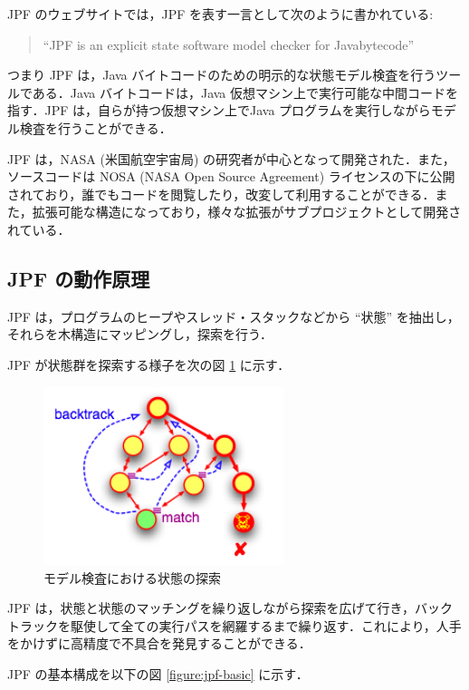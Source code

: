 \documentclass[a4j,12pt]{jarticle}
\begin{document}
JPF のウェブサイトでは，JPF を表す一言として次のように書かれている: \cite{JPF}

\begin{quotation}
``JPF is an explicit state software model checker for Java\texttrademark  bytecode''
\end{quotation}

つまり JPF は，Java バイトコードのための明示的な状態モデル検査を行うツールである．Java バイトコードは，Java 仮想マシン上で実行可能な中間コードを指す．JPF は，自らが持つ仮想マシン上でJava プログラムを実行しながらモデル検査を行うことができる．

JPF は，NASA (米国航空宇宙局) の研究者が中心となって開発された．また，ソースコードは NOSA (NASA Open Source Agreement) ライセンスの下に公開されており，誰でもコードを閲覧したり，改変して利用することができる．また，拡張可能な構造になっており，様々な拡張がサブプロジェクトとして開発されている．

\subsection{JPF の動作原理}

JPF は，プログラムのヒープやスレッド・スタックなどから ``状態'' を抽出し，それらを木構造にマッピングし，探索を行う．

JPF が状態群を探索する様子を次の図 \ref{figure:states-mc} に示す．

\begin{figure}[here]
\centering
\includegraphics[width=7cm]{images/states-mc.png}
\caption{モデル検査における状態の探索 \cite{JPF}}
\label{figure:states-mc}
\end{figure}

JPF は，状態と状態のマッチングを繰り返しながら探索を広げて行き，バックトラックを駆使して全ての実行パスを網羅するまで繰り返す．これにより，人手をかけずに高精度で不具合を発見することができる．

JPF の基本構成を以下の図 \ref{figure:jpf-basic} に示す．
\end{document}

